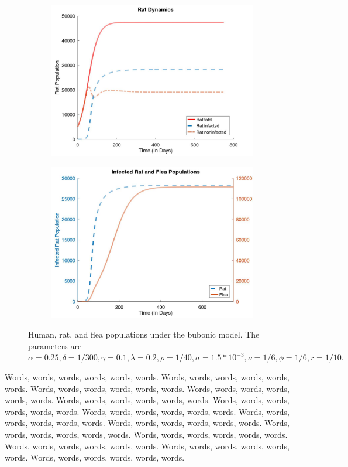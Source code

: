 \documentclass [letterpaper, 12pt] {article}
\begin{document}
\begin{figure}[h!]
\begin{subfigure}{0.48\textwidth}
	\includegraphics[width=\linewidth]{Figures/bubonicrat.jpg}
	\end{subfigure}\hspace{\fill}
	\begin{subfigure}{0.48\textwidth}
	\includegraphics[width=\linewidth]{Figures/Bubonicrf.jpg}
	\end{subfigure}
	\caption{Human, rat, and flea populations under the bubonic model. The parameters are $\alpha=0.25, \delta=1/300, \gamma=0.1, \lambda=0.2, \rho=1/40, \sigma=1.5*10^{-3}, \nu=1/6, \phi=1/6, r=1/10.$}
\end{figure}

Words, words, words, words, words, words. Words, words, words, words, words, words. Words, words, words, words, words, words. Words, words, words, words, words, words. Words, words, words, words, words, words. Words, words, words, words, words, words. Words, words, words, words, words, words. Words, words, words, words, words, words. Words, words, words, words, words, words. Words, words, words, words, words, words. Words, words, words, words, words, words. Words, words, words, words, words, words. Words, words, words, words, words, words. Words, words, words, words, words, words. 
\end{document}
